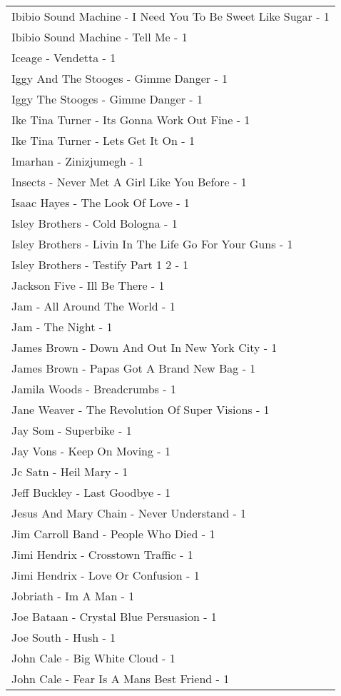 \documentclass[
]{article}
\begin{document}
\begin{longtable}{l}
Ibibio Sound Machine - I Need You To Be Sweet Like Sugar - 1 \\ 
Ibibio Sound Machine - Tell Me - 1 \\ 
Iceage - Vendetta - 1 \\ 
Iggy And The Stooges - Gimme Danger - 1 \\ 
Iggy The Stooges - Gimme Danger - 1 \\ 
Ike Tina Turner - Its Gonna Work Out Fine - 1 \\ 
Ike Tina Turner - Lets Get It On - 1 \\ 
Imarhan - Zinizjumegh - 1 \\ 
Insects - Never Met A Girl Like You Before - 1 \\ 
Isaac Hayes - The Look Of Love - 1 \\ 
Isley Brothers - Cold Bologna - 1 \\ 
Isley Brothers - Livin In The Life Go For Your Guns - 1 \\ 
Isley Brothers - Testify Part 1 2 - 1 \\ 
Jackson Five - Ill Be There - 1 \\ 
Jam - All Around The World - 1 \\ 
Jam - The Night - 1 \\ 
James Brown - Down And Out In New York City - 1 \\ 
James Brown - Papas Got A Brand New Bag - 1 \\ 
Jamila Woods - Breadcrumbs - 1 \\ 
Jane Weaver - The Revolution Of Super Visions - 1 \\ 
Jay Som - Superbike - 1 \\ 
Jay Vons - Keep On Moving - 1 \\ 
Jc Satn - Heil Mary - 1 \\ 
Jeff Buckley - Last Goodbye - 1 \\ 
Jesus And Mary Chain - Never Understand - 1 \\ 
Jim Carroll Band - People Who Died - 1 \\ 
Jimi Hendrix - Crosstown Traffic - 1 \\ 
Jimi Hendrix - Love Or Confusion - 1 \\ 
Jobriath - Im A Man - 1 \\ 
Joe Bataan - Crystal Blue Persuasion - 1 \\ 
Joe South - Hush - 1 \\ 
John Cale - Big White Cloud - 1 \\ 
John Cale - Fear Is A Mans Best Friend - 1 \\ 

\end{longtable}
\end{document}
